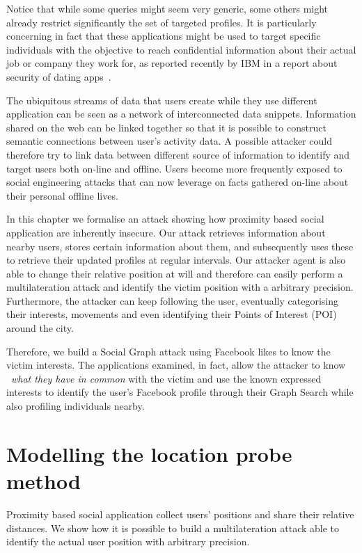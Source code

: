 Notice that while some queries might seem very generic, some others might already restrict significantly the set of targeted profiles. It is particularly concerning in fact that these applications might be used to target specific individuals with the objective to reach confidential information about their actual job or company they work for, as reported recently by IBM in a report about security of dating apps~\cite{ibm2015report}.

The ubiquitous streams of data that users create while they use different application can be seen as a network of interconnected data snippets. Information shared on the web can be linked together so that it is possible to construct semantic connections between user's activity data. A possible attacker could therefore try to link data between different source of information to identify and target users both on-line and offline. Users become more frequently exposed to social engineering attacks that can now leverage on facts gathered on-line about their personal offline lives.

In this chapter we formalise an attack showing how proximity based social application are inherently insecure. Our attack retrieves information about nearby users, stores certain information about them, and subsequently uses these to retrieve their updated profiles at regular intervals. Our attacker agent is also able to change their relative position at will and therefore can easily perform a multilateration attack and identify the victim position with a arbitrary precision. Furthermore, the attacker can keep following the user, eventually categorising their interests, movements and even identifying their Points of Interest (POI) around the city.

Therefore, we build a Social Graph attack using Facebook likes to know the victim interests. The applications examined, in fact, allow the attacker to know ~\emph{what they have in common} with the victim and use the known expressed interests to identify the user's Facebook profile through their Graph Search while also profiling individuals nearby.

\section{Modelling the location probe method}
\label{sec:loc-probe}
\noindent
Proximity based social application collect users' positions and share their relative distances. We show how it is possible to build a multilateration attack able to identify the actual user position with arbitrary precision.

